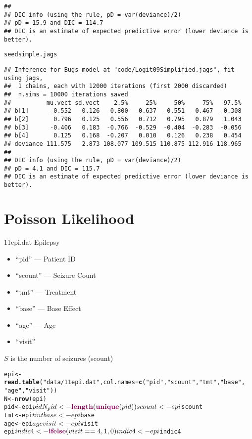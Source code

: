 \documentclass[12pt,letterpaper,oneside]{article}\usepackage{graphicx, color}
\makeatletter
\newcommand{\hlfunctioncall}[1]{\textcolor[rgb]{0.501960784313725,0,0.329411764705882}{\textbf{#1}}}%
\newcommand{\hlstring}[1]{\textcolor[rgb]{0.6,0.6,1}{#1}}%
\newenvironment{kframe}{%
 \def\at@end@of@kframe{}%
 \ifinner\ifhmode%
  \def\at@end@of@kframe{\end{minipage}}%
  \begin{minipage}{\columnwidth}%
 \fi\fi%
 \def\FrameCommand##1{\hskip\@totalleftmargin \hskip-\fboxsep
 \colorbox{shadecolor}{##1}\hskip-\fboxsep
     \hskip-\linewidth \hskip-\@totalleftmargin \hskip\columnwidth}%
 \MakeFramed {\advance\hsize-\width
   \@totalleftmargin\z@ \linewidth\hsize
   \@setminipage}}%
 {\par\unskip\endMakeFramed%
 \at@end@of@kframe}
\newenvironment{knitrout}{}{} %
\newcommand{\dateTaken}{January 7, 2013}
\makeatother
\begin{document}
\begin{knitrout}
\begin{kframe}
\begin{verbatim}
## 
## DIC info (using the rule, pD = var(deviance)/2)
## pD = 15.9 and DIC = 114.7
## DIC is an estimate of expected predictive error (lower deviance is better).
\end{verbatim}
\begin{alltt}
seedsimple.jags
\end{alltt}
\begin{verbatim}
## Inference for Bugs model at "code/Logit09Simplified.jags", fit using jags,
##  1 chains, each with 12000 iterations (first 2000 discarded)
##  n.sims = 10000 iterations saved
##          mu.vect sd.vect    2.5%     25%     50%     75%   97.5%
## b[1]      -0.552   0.126  -0.800  -0.637  -0.551  -0.467  -0.308
## b[2]       0.796   0.125   0.556   0.712   0.795   0.879   1.043
## b[3]      -0.406   0.183  -0.766  -0.529  -0.404  -0.283  -0.056
## b[4]       0.125   0.168  -0.207   0.010   0.126   0.238   0.454
## deviance 111.575   2.873 108.077 109.515 110.875 112.916 118.965
## 
## DIC info (using the rule, pD = var(deviance)/2)
## pD = 4.1 and DIC = 115.7
## DIC is an estimate of expected predictive error (lower deviance is better).
\end{verbatim}
\end{kframe}
\end{knitrout}

\renewcommand{\dateTaken}{March 21, 2013}
\daysep

\section{Poisson Likelihood} %
\label{sec:poisson_likelihood}
11epi.dat Epilepsy
\begin{itemize}
    \item ``pid'' --- Patient ID
    \item ``scount'' --- Seizure Count
    \item ``tmt'' --- Treatment
    \item ``base'' --- Base Effect
    \item ``age'' --- Age
    \item ``visit''
\end{itemize}

$S$ is the number of seizures (scount)
\begin{knitrout}\scriptsize
{}\color{fgcolor}\begin{kframe}
\begin{alltt}
epi <- \hlfunctioncall{read.table}(\hlstring{"data/11epi.dat"}, col.names = \hlfunctioncall{c}(\hlstring{"pid"}, \hlstring{"scount"}, \hlstring{"tmt"}, \hlstring{"base"}, 
    \hlstring{"age"}, \hlstring{"visit"}))
N <- \hlfunctioncall{nrow}(epi)
pid <- epi$pid
N_pid <- \hlfunctioncall{length}(\hlfunctioncall{unique}(pid))
scount <- epi$scount
tmt <- epi$tmt
base <- epi$base
age <- epi$age
visit <- epi$visit
epi$indic4 <- \hlfunctioncall{ifelse}(visit == 4, 1, 0)
indic4 <- epi$indic4
\end{alltt}
\end{kframe}
\end{knitrout}
\end{document}
